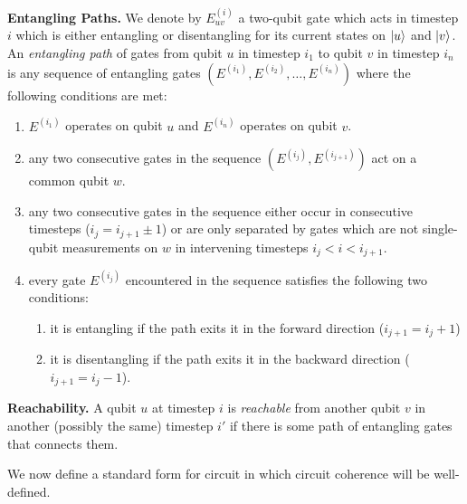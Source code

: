 \begin{definition}{\textbf{Entangling Paths.}}
We denote by $E^{(i)}_{uv}$ a two-qubit gate which acts in
timestep $i$ which is either entangling or disentangling for its current states on
$\left\vert{u}\right\rangle$ and $\left\vert{v}\right\rangle$.
An \emph{entangling path} of gates from qubit $u$ in timestep $i_1$ to
qubit $v$ in timestep $i_n$ is
any sequence of entangling gates $(E^{(i_1)}, E^{(i_2)}, \ldots, E^{(i_n)})$
where the following conditions are met:

\begin{enumerate}
\item
$E^{(i_1)}$ operates on qubit $u$ and $E^{(i_n)}$ operates on qubit $v$.

\item
any two consecutive gates in the sequence $(E^{(i_j)},E^{(i_{j+1})})$
act on a common qubit $w$.
\item
any two consecutive gates in the sequence either occur in
consecutive timesteps ($i_j = i_{j+1} \pm 1$) or are only separated by
gates which are not single-qubit measurements on $w$ in intervening timesteps $i_j < i < i_{j+1}$.
\item
every gate $E^{(i_j)}$ encountered in the sequence satisfies the
following two conditions:

\begin{enumerate}
\item it is entangling if
the path exits it in the forward direction ($i_{j+1} = i_j + 1$)
\item it is disentangling if the path exits it in the backward direction
($i_{j+1} = i_j - 1$).
\end{enumerate}
\end{enumerate}

\end{definition}

\begin{definition}{\textbf{Reachability.}}
A qubit $u$ at timestep $i$ is \emph{reachable} from another qubit $v$ in
another (possibly the same) timestep $i'$ if there is some path of entangling gates that
connects them.
\end{definition}

We now define a standard form for circuit in which circuit coherence will be
well-defined.

